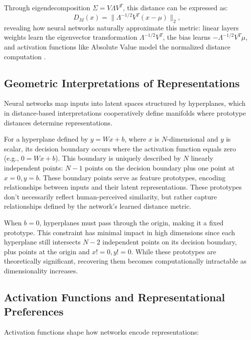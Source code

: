 Through eigendecomposition $\Sigma = V\Lambda V^T$, this distance can be expressed as:
\begin{equation}
    D_M(x) = \| \Lambda^{-1/2} V^T (x - \mu) \|_2,
\end{equation}
revealing how neural networks naturally approximate this metric: linear layers weights learn the eigenvector transformation $\Lambda^{-1/2} V^T$, the bias learns $-\Lambda^{-1/2} V^T \mu$, and activation functions like Absolute Value model the normalized distance computation \cite{oursland2024interpreting}.

\subsection{Geometric Interpretations of Representations}

Neural networks map inputs into latent spaces structured by hyperplanes, which in distance-based interpretations cooperatively define manifolds where prototype distances determine representations.

For a hyperplane defined by $y = Wx + b$, where $x$ is $N$-dimensional and $y$ is scalar, its decision boundary occurs where the activation function equals zero (e.g., $0 = Wx + b$). This boundary is uniquely described by $N$ linearly independent points: $N-1$ points on the decision boundary plus one point at ${x=0, y=b}$. These boundary points serve as feature prototypes, encoding relationships between inputs and their latent representations. These prototypes don't necessarily reflect human-perceived similarity, but rather capture relationships defined by the network's learned distance metric.

When $b=0$, hyperplanes must pass through the origin, making it a fixed prototype. This constraint has minimal impact in high dimensions since each hyperplane still intersects $N-2$ independent points on its decision boundary, plus points at the origin and ${x!=0, y!=0}$. While these prototypes are theoretically significant, recovering them becomes computationally intractable as dimensionality increases.
\subsection{Activation Functions and Representational Preferences}

Activation functions shape how networks encode representations:

